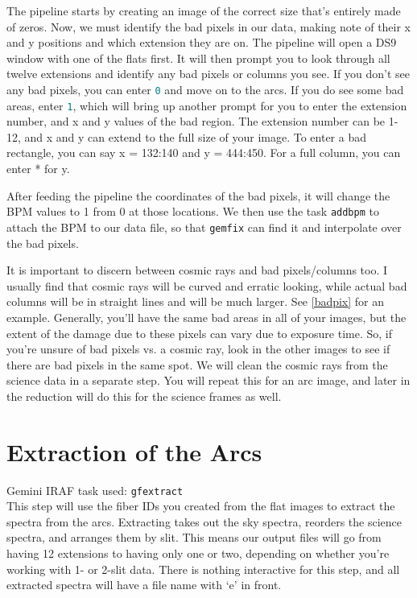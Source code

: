 \documentclass[12pt]{report}
\newcommand{\ty}[1]{\textcolor{teal}{\texttt{#1}}}
\begin{document}
The pipeline starts by creating an image of the correct size that's entirely made of zeros. Now, we must identify the bad pixels in our data, making note of their x and y positions and which extension they are on. The pipeline will open a DS9 window with one of the flats first. It will then prompt you to look through all twelve extensions and identify any bad pixels or columns you see. If you don't see any bad pixels, you can enter \ty{0} and move on to the arcs. If you do see some bad areas, enter \ty{1}, which will bring up another prompt for you to enter the extension number, and x and y values of the bad region. The extension number can be 1-12, and x and y can extend to the full size of your image. To enter a bad rectangle, you can say x = 132:140 and y = 444:450. For a full column, you can enter * for y.

After feeding the pipeline the coordinates of the bad pixels, it will change the BPM values to 1 from 0 at those locations. We then use the task \texttt{addbpm} to attach the BPM to our data file, so that \texttt{gemfix} can find it and interpolate over the bad pixels.

It is important to discern between cosmic rays and bad pixels/columns too. I usually find that cosmic rays will be curved and erratic looking, while actual bad columns will be in straight lines and will be much larger. See \autoref{badpix} for an example. Generally, you'll have the same bad areas in all of your images, but the extent of the damage due to these pixels can vary due to exposure time. So, if you're unsure of bad pixels vs. a cosmic ray, look in the other images to see if there are bad pixels in the same spot. We will clean the cosmic rays from the science data in a separate step. You will repeat this for an arc image, and later in the reduction will do this for the science frames as well.

\section{Extraction of the Arcs}
\noindent Gemini IRAF task used: \texttt{gfextract}\\

\noindent This step will use the fiber IDs you created from the flat images to extract the spectra from the arcs. Extracting takes out the sky spectra, reorders the science spectra, and arranges them by slit. This means our output files will go from having 12 extensions to having only one or two, depending on whether you're working with 1- or 2-slit data. There is nothing interactive for this step, and all extracted spectra will have a file name with `e' in front.
\end{document}
